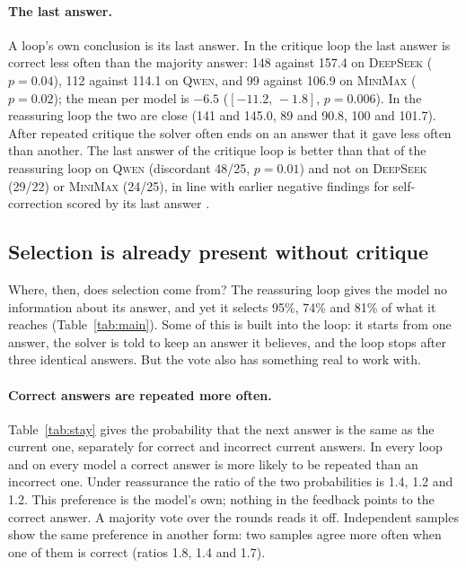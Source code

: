 \documentclass[11pt]{article}
\newcommand{\ds}{\textsc{DeepSeek}}
\newcommand{\qw}{\textsc{Qwen}}
\newcommand{\mm}{\textsc{MiniMax}}
\newcommand{\ci}[2]{$[#1,\,#2]$}
\begin{document}
\paragraph{The last answer.}
A loop's own conclusion is its last answer.
In the critique loop the last answer is correct less often than the majority answer: 148 against 157.4 on \ds{} ($p=0.04$), 112 against 114.1 on \qw, and 99 against 106.9 on \mm{} ($p=0.02$); the mean per model is $-6.5$ (\ci{-11.2}{-1.8}, $p=0.006$).
In the reassuring loop the two are close (141 and 145.0, 89 and 90.8, 100 and 101.7).
After repeated critique the solver often ends on an answer that it gave less often than another.
The last answer of the critique loop is better than that of the reassuring loop on \qw{} (discordant 48/25, $p=0.01$) and not on \ds{} (29/22) or \mm{} (24/25), in line with earlier negative findings for self-correction scored by its last answer \citep{huang2024cannot}.

\subsection{Selection is already present without critique}
\label{sec:mech}

Where, then, does selection come from?
The reassuring loop gives the model no information about its answer, and yet it selects 95\%, 74\% and 81\% of what it reaches (Table~\ref{tab:main}).
Some of this is built into the loop: it starts from one answer, the solver is told to keep an answer it believes, and the loop stops after three identical answers.
But the vote also has something real to work with.

\paragraph{Correct answers are repeated more often.}
Table~\ref{tab:stay} gives the probability that the next answer is the same as the current one, separately for correct and incorrect current answers.
In every loop and on every model a correct answer is more likely to be repeated than an incorrect one.
Under reassurance the ratio of the two probabilities is 1.4, 1.2 and 1.2.
This preference is the model's own; nothing in the feedback points to the correct answer.
A majority vote over the rounds reads it off.
Independent samples show the same preference in another form: two samples agree more often when one of them is correct (ratios 1.8, 1.4 and 1.7).
\end{document}
